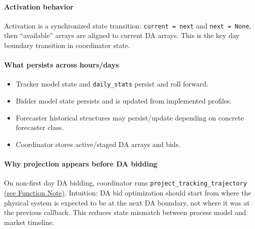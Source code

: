 \documentclass{article}
\begin{document}
\paragraph{Activation behavior}
Activation is a synchronized state transition: \texttt{current = next} and \texttt{next = None}, then ``available'' arrays are aligned to current DA arrays. This is the key day boundary transition in coordinator state.

\paragraph{What persists across hours/days}
\begin{itemize}[leftmargin=*]
  \item Tracker model state and \texttt{daily\_stats} persist and roll forward.
  \item Bidder model state persists and is updated from implemented profiles.
  \item Forecaster historical structures may persist/update depending on concrete forecaster class.
  \item Coordinator stores active/staged DA arrays and bids.
\end{itemize}

\paragraph{Why projection appears before DA bidding}
On non-first day DA bidding, coordinator runs \texttt{project\_tracking\_trajectory} \hyperref[fn:project_tracking_trajectory]{(see Function Note)}. Intuition: DA bid optimization should start from where the physical system is expected to be at the next DA boundary, not where it was at the previous callback. This reduces state mismatch between process model and market timeline.
\end{document}
